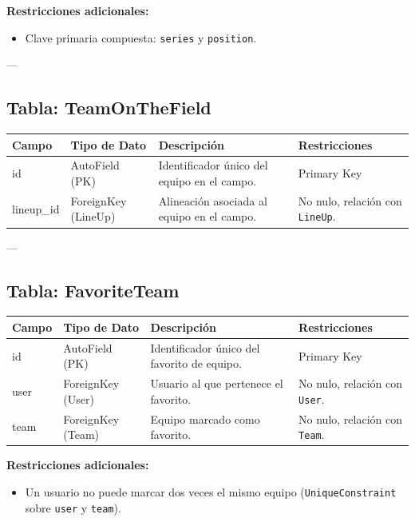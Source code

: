 \documentclass{report}
\begin{document}
    \textbf{Restricciones adicionales:}
    \begin{itemize}
        \item Clave primaria compuesta: \texttt{series} y \texttt{position}.
    \end{itemize}
    
    ---
    
    \subsection*{Tabla: TeamOnTheField}
    \begin{tabular}{|>{\raggedright\arraybackslash}p{3cm}|>{\raggedright\arraybackslash}p{3cm}|>{\raggedright\arraybackslash}p{6cm}|>{\raggedright\arraybackslash}p{4cm}|}
        \hline
        \textbf{Campo} & \textbf{Tipo de Dato} & \textbf{Descripción} & \textbf{Restricciones} \\
        \hline
        id & AutoField (PK) & Identificador único del equipo en el campo. & Primary Key \\
        \hline
        lineup\_id & ForeignKey (LineUp) & Alineación asociada al equipo en el campo. & No nulo, relación con \texttt{LineUp}. \\
        \hline
    \end{tabular}
    
    ---

    \subsection*{Tabla: FavoriteTeam}
    \begin{tabular}{|>{\raggedright\arraybackslash}p{3cm}|>{\raggedright\arraybackslash}p{3cm}|>{\raggedright\arraybackslash}p{6cm}|>{\raggedright\arraybackslash}p{4cm}|}
        \hline
        \textbf{Campo} & \textbf{Tipo de Dato} & \textbf{Descripción} & \textbf{Restricciones} \\
        \hline
        id & AutoField (PK) & Identificador único del favorito de equipo. & Primary Key \\
        \hline
        user & ForeignKey (User) & Usuario al que pertenece el favorito. & No nulo, relación con \texttt{User}. \\
        \hline
        team & ForeignKey (Team) & Equipo marcado como favorito. & No nulo, relación con \texttt{Team}. \\
        \hline
    \end{tabular}

    \textbf{Restricciones adicionales:}
    \begin{itemize}
        \item Un usuario no puede marcar dos veces el mismo equipo (\texttt{UniqueConstraint} sobre \texttt{user} y \texttt{team}).
    \end{itemize}
\end{document}
